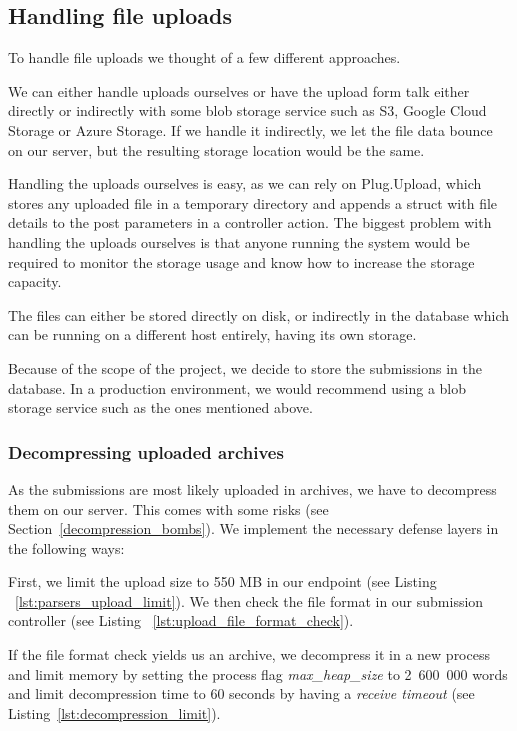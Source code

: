 \subsection{Handling file uploads}

To handle file uploads we thought of a few different approaches.

We can either handle uploads ourselves or have the upload form talk either directly or indirectly with some blob storage service such as S3, Google Cloud Storage or Azure Storage. If we handle it indirectly, we let the file data bounce on our server, but the resulting storage location would be the same.

Handling the uploads ourselves is easy, as we can rely on Plug.Upload, which stores any uploaded file in a temporary directory and appends a struct with file details to the post parameters in a controller action. The biggest problem with handling the uploads ourselves is that anyone running the system would be required to monitor the storage usage and know how to increase the storage capacity.

The files can either be stored directly on disk, or indirectly in the database which can be running on a different host entirely, having its own storage.

Because of the scope of the project, we decide to store the submissions in the database. In a production environment, we would recommend using a blob storage service such as the ones mentioned above.

\subsubsection*{Decompressing uploaded archives}

As the submissions are most likely uploaded in archives, we have to decompress them on our server. This comes with some risks (see Section~\ref{decompression_bombs}). We implement the necessary defense layers in the following ways:

First, we limit the upload size to 550 MB in our endpoint (see Listing ~\ref{lst:parsers_upload_limit}). We then check the file format in our submission controller (see Listing ~\ref{lst:upload_file_format_check}).

If the file format check yields us an archive, we decompress it in a new process and limit memory by setting the process flag \emph{max\_heap\_size} to 2~600~000 words and limit decompression time to 60 seconds by having a \emph{receive timeout} (see Listing~\ref{lst:decompression_limit}).

